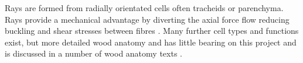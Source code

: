 Rays are formed from radially orientated cells often tracheids or parenchyma. Rays provide a mechanical advantage by diverting the axial force flow reducing buckling and shear stresses between fibres \cite{mattheck1997wood}. Many further cell types and functions exist, but more detailed wood anatomy and
has little bearing on this project and is discussed in a number of wood anatomy
texts \cite{fromm2013cellular}.